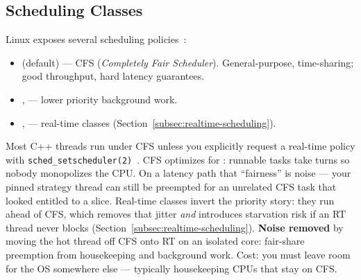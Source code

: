\subsection{Scheduling Classes}
\label{subsec:scheduling-classes}
Linux exposes several scheduling policies~\cite{man-sched}:
\begin{itemize}
    \item {} (default) --- CFS (\emph{Completely Fair Scheduler}). 
          General-purpose, time-sharing; good throughput,  hard latency guarantees.
    \item {},  --- lower priority background work.
    \item {},  --- real-time classes (Section~\ref{subsec:realtime-scheduling}).
\end{itemize}
Most C++ threads run under CFS unless you explicitly request a real-time policy with 
\texttt{sched\_setscheduler(2)}~\cite{man-sched-setscheduler}.
\newline
CFS optimizes for : runnable tasks take turns so nobody monopolizes the 
CPU. On a latency path that ``fairness'' is noise --- your pinned strategy thread can still be 
preempted for an unrelated CFS task that looked entitled to a slice. Real-time classes invert 
the priority story: they run ahead of CFS, which removes that jitter \emph{and} introduces 
starvation risk if an RT thread never blocks (Section~\ref{subsec:realtime-scheduling}).
\newline
\textbf{Noise removed} by moving the hot thread off CFS onto RT on an isolated core: fair-share 
preemption from housekeeping and background work. Cost: you must leave room for the OS 
somewhere else --- typically housekeeping CPUs that stay on CFS.

